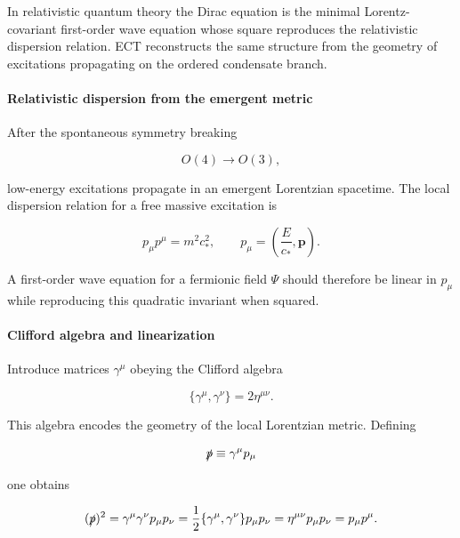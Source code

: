 \documentclass[11pt,a4paper]{article}
\numberwithin{equation}{section}
\begin{document}
In relativistic quantum theory the Dirac equation is the minimal
Lorentz-covariant first-order wave equation whose square reproduces
the relativistic dispersion relation.  ECT reconstructs the same
structure from the geometry of excitations propagating on the ordered
condensate branch.

\paragraph{Relativistic dispersion from the emergent metric}

After the spontaneous symmetry breaking

\begin{equation}
O(4)\rightarrow O(3),
\end{equation}

low-energy excitations propagate in an emergent Lorentzian spacetime.
The local dispersion relation for a free massive excitation is

\begin{equation}
p_\mu p^\mu = m^2 c_*^2,
\qquad
p_\mu = \left(\frac{E}{c_*},\mathbf p\right).
\end{equation}

A first-order wave equation for a fermionic field $\Psi$ should therefore
be linear in $p_\mu$ while reproducing this quadratic invariant when
squared.

\paragraph{Clifford algebra and linearization}

Introduce matrices $\gamma^\mu$ obeying the Clifford algebra

\begin{equation}
\{\gamma^\mu,\gamma^\nu\}=2\eta^{\mu\nu}.
\end{equation}

This algebra encodes the geometry of the local Lorentzian metric.
Defining

\begin{equation}
\slashed{p}\equiv \gamma^\mu p_\mu
\end{equation}

one obtains

\begin{equation}
(\slashed{p})^2
=
\gamma^\mu\gamma^\nu p_\mu p_\nu
=
\frac{1}{2}\{\gamma^\mu,\gamma^\nu\}p_\mu p_\nu
=
\eta^{\mu\nu}p_\mu p_\nu
=
p_\mu p^\mu .
\end{equation}
\end{document}
